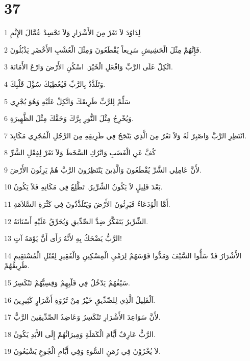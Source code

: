 \chapter{37}

\par 1 لِدَاوُدَ لاَ تَغَرْ مِنَ الأَشْرَارِ وَلاَ تَحْسِدْ عُمَّالَ الإِثْمِ
\par 2 فَإِنَّهُمْ مِثْلَ الْحَشِيشِ سَرِيعاً يُقْطَعُونَ وَمِثْلَ الْعُشْبِ الأَخْضَرِ يَذْبُلُونَ.
\par 3 اتَّكِلْ عَلَى الرَّبِّ وَافْعَلِ الْخَيْرَ. اسْكُنِ الأَرْضَ وَارْعَ الأَمَانَةَ.
\par 4 وَتَلَذَّذْ بِالرَّبِّ فَيُعْطِيَكَ سُؤْلَ قَلْبِكَ.
\par 5 سَلِّمْ لِلرَّبِّ طَرِيقَكَ وَاتَّكِلْ عَلَيْهِ وَهُوَ يُجْرِي
\par 6 وَيُخْرِجُ مِثْلَ النُّورِ بِرَّكَ وَحَقَّكَ مِثْلَ الظَّهِيرَةِ.
\par 7 انْتَظِرِ الرَّبَّ وَاصْبِرْ لَهُ وَلاَ تَغَرْ مِنَ الَّذِي يَنْجَحُ فِي طَرِيقِهِ مِنَ الرَّجُلِ الْمُجْرِي مَكَايِدَ.
\par 8 كُفَّ عَنِ الْغَضَبِ وَاتْرُكِ السَّخَطَ وَلاَ تَغَرْ لِفِعْلِ الشَّرِّ
\par 9 لأَنَّ عَامِلِي الشَّرِّ يُقْطَعُونَ وَالَّذِينَ يَنْتَظِرُونَ الرَّبَّ هُمْ يَرِثُونَ الأَرْضَ.
\par 10 بَعْدَ قَلِيلٍ لاَ يَكُونُ الشِّرِّيرُ. تَطَّلِعُ فِي مَكَانِهِ فَلاَ يَكُونُ.
\par 11 أَمَّا الْوُدَعَاءُ فَيَرِثُونَ الأَرْضَ وَيَتَلَذَّذُونَ فِي كَثْرَةِ السَّلاَمَةِ.
\par 12 الشِّرِّيرُ يَتَفَكَّرُ ضِدَّ الصِّدِّيقِ وَيُحَرِّقُ عَلَيْهِ أَسْنَانَهُ.
\par 13 الرَّبُّ يَضْحَكُ بِهِ لأَنَّهُ رَأَى أَنَّ يَوْمَهُ آتٍ!
\par 14 الأَشْرَارُ قَدْ سَلُّوا السَّيْفَ وَمَدُّوا قَوْسَهُمْ لِرَمْيِ الْمِسْكِينِ وَالْفَقِيرِ لِقَتْلِ الْمُسْتَقِيمِ طَرِيقُهُمْ.
\par 15 سَيْفُهُمْ يَدْخُلُ فِي قَلْبِهِمْ وَقِسِيُّهُمْ تَنْكَسِرُ.
\par 16 اَلْقَلِيلُ الَّذِي لِلصِّدِّيقِ خَيْرٌ مِنْ ثَرْوَةِ أَشْرَارٍ كَثِيرِينَ.
\par 17 لأَنَّ سَوَاعِدَ الأَشْرَارِ تَنْكَسِرُ وَعَاضِدُ الصِّدِّيقِينَ الرَّبُّ.
\par 18 الرَّبُّ عَارِفٌ أَيَّامَ الْكَمَلَةِ وَمِيرَاثُهُمْ إِلَى الأَبَدِ يَكُونُ.
\par 19 لاَ يُخْزَوْنَ فِي زَمَنِ السُّوءِ وَفِي أَيَّامِ الْجُوعِ يَشْبَعُونَ.
